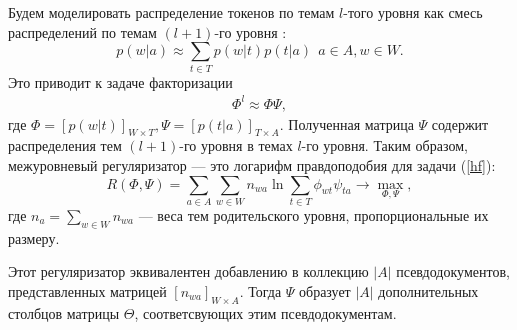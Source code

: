 Будем моделировать распределение токенов по темам $l$-того уровня как смесь распределений по темам $(l+1)$-го уровня \cite{hARTM}:
$$p(w|a) \approx \sum\limits_{t \in T}  p(w|t)p(t|a) \ \ a\in A, w \in W.$$
Это приводит к задаче факторизации
\begin{align}
\Phi^l \approx \Phi \Psi, \tag{**}\label{hf}
\end{align}
где $\Phi = [p(w|t)]_{W \times T}, \Psi=[p(t|a)]_{T \times A}$. Полученная матрица $\Psi$ содержит распределения тем $(l+1)$-го уровня в темах $l$-го уровня. 
Таким образом, межуровневый регуляризатор --- это логарифм правдоподобия для задачи (\ref{hf}): $$R(\Phi, \Psi) = \sum\limits_{a \in A} \sum\limits_{w \in W} n_{wa} \ln{\sum\limits_{t \in T} \phi_{wt}\psi_{ta}}\rightarrow 
\max\limits_{\Phi, \Psi},$$ где $n_{a} = \sum\limits_{w \in W} n_{wa}$ --- веса тем родительского уровня, пропорциональные их размеру.


Этот регуляризатор эквивалентен добавлению в коллекцию $|A|$ псевдодокументов, представленных матрицей $[n_{wa}]_{W\times A}$. Тогда $\Psi$ образует $|A|$ дополнительных столбцов матрицы $\Theta$, соответсвующих этим псевдодокументам.

